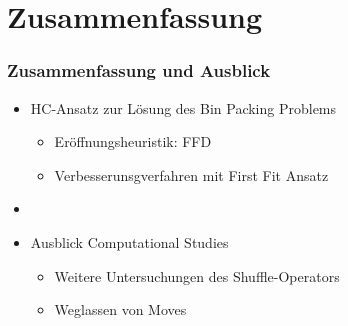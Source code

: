 \documentclass{beamer}
\begin{document}
\section{Zusammenfassung} 
\begin{frame}
\frametitle{Zusammenfassung und Ausblick}
\begin{itemize}
\item HC-Ansatz zur Lösung des Bin Packing Problems
\begin{itemize}
\item Eröffnungsheuristik: FFD
\item Verbesserunsgverfahren mit First Fit Ansatz
\end{itemize}
\item[] 
\item Ausblick Computational Studies
\begin{itemize}
\item Weitere Untersuchungen des Shuffle-Operators
\item Weglassen von Moves
\end{itemize}
\end{itemize}


\end{frame}
\end{document}
